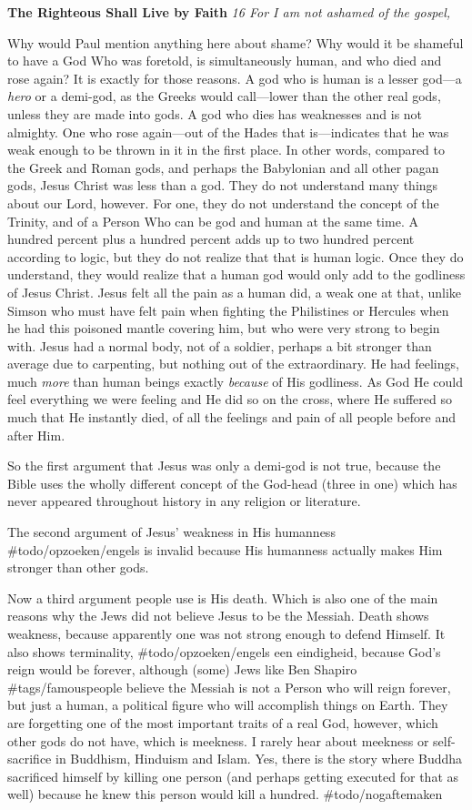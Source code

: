 \textbf{The Righteous Shall Live by Faith} \emph{16 For I am not ashamed
of the gospel,}

Why would Paul mention anything here about shame? Why would it be
shameful to have a God Who was foretold, is simultaneously human, and
who died and rose again? It is exactly for those reasons. A god who is
human is a lesser god---a \emph{hero} or a demi-god, as the Greeks would
call---lower than the other real gods, unless they are made into gods. A
god who dies has weaknesses and is not almighty. One who rose
again---out of the Hades that is---indicates that he was weak enough to
be thrown in it in the first place. In other words, compared to the
Greek and Roman gods, and perhaps the Babylonian and all other pagan
gods, Jesus Christ was less than a god. They do not understand many
things about our Lord, however. For one, they do not understand the
concept of the Trinity, and of a Person Who can be god and human at the
same time. A hundred percent plus a hundred percent adds up to two
hundred percent according to logic, but they do not realize that that is
human logic. Once they do understand, they would realize that a human
god would only add to the godliness of Jesus Christ. Jesus felt all the
pain as a human did, a weak one at that, unlike Simson who must have
felt pain when fighting the Philistines or Hercules when he had this
poisoned mantle covering him, but who were very strong to begin with.
Jesus had a normal body, not of a soldier, perhaps a bit stronger than
average due to carpenting, but nothing out of the extraordinary. He had
feelings, much \emph{more} than human beings exactly \emph{because} of
His godliness. As God He could feel everything we were feeling and He
did so on the cross, where He suffered so much that He instantly died,
of all the feelings and pain of all people before and after Him.

So the first argument that Jesus was only a demi-god is not true,
because the Bible uses the wholly different concept of the God-head
(three in one) which has never appeared throughout history in any
religion or literature.

The second argument of Jesus' weakness in His humanness
\#todo/opzoeken/engels is invalid because His humanness actually makes
Him stronger than other gods.

Now a third argument people use is His death. Which is also one of the
main reasons why the Jews did not believe Jesus to be the Messiah. Death
shows weakness, because apparently one was not strong enough to defend
Himself. It also shows terminality, \#todo/opzoeken/engels een
eindigheid, because God's reign would be forever, although (some) Jews
like Ben Shapiro \#tags/famouspeople believe the Messiah is not a Person
who will reign forever, but just a human, a political figure who will
accomplish things on Earth. They are forgetting one of the most
important traits of a real God, however, which other gods do not have,
which is meekness. I rarely hear about meekness or self-sacrifice in
Buddhism, Hinduism and Islam. Yes, there is the story where Buddha
sacrificed himself by killing one person (and perhaps getting executed
for that as well) because he knew this person would kill a hundred.
\#todo/nogaftemaken

